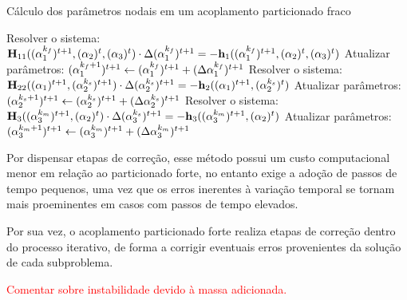 \begin{algorithm}[h]
    \caption{Cálculo dos parâmetros nodais em um acoplamento particionado fraco}
    \label{alg:PartFraco}
    Resolver o sistema: $\mathbf{H}_{11}((\mathbf{\alpha}_1^{k_f})^{t+1},(\mathbf{\alpha}_2)^t,(\mathbf{\alpha}_3)^t)\cdot\Delta(\mathbf{\alpha}_1^{k_f})^{t+1}=-\mathbf{h}_1((\mathbf{\alpha}_1^{k_f})^{t+1},(\mathbf{\alpha}_2)^t,(\mathbf{\alpha}_3)^t)$\;
    Atualizar parâmetros: $(\mathbf{\alpha}_1^{k_f+1})^{t+1}\gets(\mathbf{\alpha}_1^{k_f})^{t+1}+(\Delta\mathbf{\alpha}_1^{k_f})^{t+1}$\;
    Resolver o sistema: $\mathbf{H}_{22}((\mathbf{\alpha}_1)^{t+1},(\mathbf{\alpha}_2^{k_s})^{t+1})\cdot\Delta(\mathbf{\alpha}_2^{k_s})^{t+1}=-\mathbf{h}_2((\mathbf{\alpha}_1)^{t+1},(\mathbf{\alpha}_2^{k_s})^t)$\;
    Atualizar parâmetros: $(\mathbf{\alpha}_2^{k_s+1})^{t+1}\gets(\mathbf{\alpha}_2^{k_s})^{t+1}+(\Delta\mathbf{\alpha}_2^{k_s})^{t+1}$\;
    Resolver o sistema: $\mathbf{H}_{3}((\mathbf{\alpha}_3^{k_m})^{t+1},(\mathbf{\alpha}_2)^t)\cdot\Delta(\mathbf{\alpha}_3^{k_s})^{t+1}=-\mathbf{h}_3((\mathbf{\alpha}_3^{k_m})^{t+1},(\mathbf{\alpha}_2)^t)$\;
    Atualizar parâmetros: $(\mathbf{\alpha}_3^{k_m+1})^{t+1}\gets(\mathbf{\alpha}_3^{k_m})^{t+1}+(\Delta\mathbf{\alpha}_3^{k_m})^{t+1}$\;
\end{algorithm}

Por dispensar etapas de correção, esse método possui um custo computacional menor em relação ao particionado forte, no entanto exige a adoção de passos de tempo pequenos, uma vez que os erros inerentes à variação temporal se tornam mais proeminentes em casos com passos de tempo elevados.

Por sua vez, o acoplamento particionado forte realiza etapas de correção dentro do processo iterativo, de forma a corrigir eventuais erros provenientes da solução de cada subproblema.

\textcolor{red}{Comentar sobre instabilidade devido à massa adicionada.}
